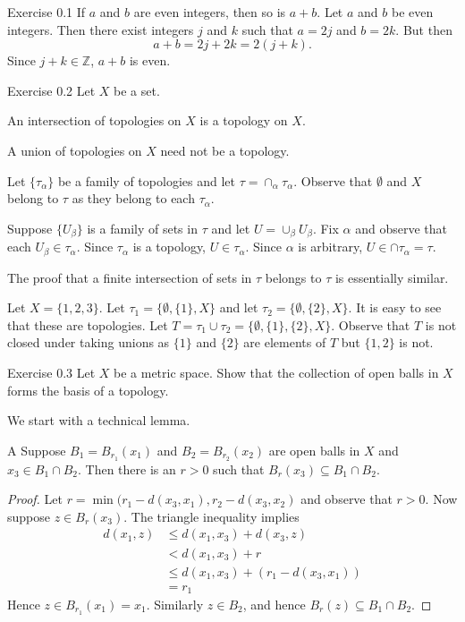\documentclass{homework}
\newcommand{\Ints}{\ensuremath{\mathbb Z}} %
\begin{document}
\begin{problems}

\problem Exercise 0.1 
If $a$ and $b$ are even integers, then so is $a+b$.
\solution
Let $a$ and $b$ be even integers.  Then there exist integers
$j$ and $k$ such that $a=2j$ and $b=2k$.  But then
\begin{equation}
a+b = 2j+ 2k = 2(j+k).
\end{equation}
Since $j+k\in\Ints$, $a+b$ is even.

\problem Exercise 0.2 
Let $X$ be a set.
\begin{subproblems}
\item An intersection of topologies on $X$ is a topology on $X$.
\item A union of topologies on $X$ need not be a topology.
\end{subproblems}
\subsol
Let $\{\tau_\alpha\}$ be a family of topologies and let $\tau=\cap_\alpha \tau_\alpha$.  
Observe that $\emptyset$ and $X$ belong to $\tau$ as they belong to each $\tau_\alpha$.

Suppose $\{U_\beta\}$ is a family of sets in $\tau$ and let $U=\cup_\beta U_\beta$. 
Fix $\alpha$ and observe that each $U_\beta\in \tau_\alpha$. Since $\tau_\alpha$
is a topology, $U\in\tau_\alpha$.  Since $\alpha$ is arbitrary, $U\in\cap\tau_\alpha=\tau$.

The proof that a finite intersection of sets in $\tau$ belongs to $\tau$ is essentially similar.

\subsol
Let $X=\{1,2,3\}$.  Let $\tau_1 = \{\emptyset, \{1\}, X\}$ and let $\tau_2 = \{\emptyset, \{2\}, X\}$.
It is easy to see that these are topologies.
Let $T=\tau_1\cup \tau_2 = \{\emptyset, \{1\}, \{2\}, X\}$.   Observe that $T$ is not closed under
taking unions as $\{1\}$ and $\{2\}$ are elements of $T$ but $\{1,2\}$ is not.

\problem Exercise 0.3 
Let $X$ be a metric space.  Show that 
the collection of open balls in $X$ forms the basis of a topology.

\solution
We start with a technical lemma.
\begin{lemma}{A}\label{lem:DAMrefine}  
Suppose $B_1=B_{r_1}(x_1)$ and $B_2=B_{r_2}(x_2)$ are 
open balls in $X$ and $x_3\in B_1\cap B_2$.  Then there is an $r>0$ such
that $B_r(x_3)\subseteq B_1\cap B_2$.
\end{lemma}
\begin{proof}
Let $r = \min(r_1-d(x_3,x_1),r_2-d(x_3,x_2)$ and observe that $r>0$.  Now suppose
$z\in B_{r}(x_3)$.  The triangle inequality implies
\begin{align*} 
d(x_1,z)&\le d(x_1,x_3) + d(x_3,z) \\
&< d(x_1,x_3) + r \\
&\le d(x_1,x_3) + ( r_1-d(x_3,x_1) ) \\
&= r_1
\end{align*}
Hence $z\in B_{r_1}(x_1)=x_1$.  Similarly $z\in B_2$, and hence $B_r(z)\subseteq B_1\cap B_2$.
\end{proof}


\end{problems}
\end{document}
